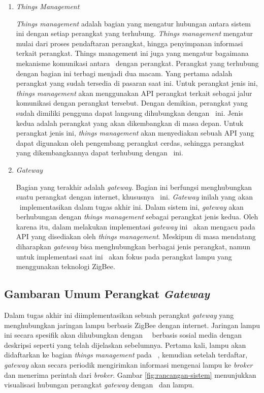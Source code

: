 \begin{enumerate}
	\item \textit{Things Management}
	
	\textit{Things management} adalah bagian yang mengatur hubungan antara sistem ini dengan setiap perangkat yang terhubung. \textit{Things management} mengatur mulai dari proses pendaftaran perangkat, hingga penyimpanan informasi terkait perangkat. Things management ini juga yang mengatur bagaimana mekanisme komunikasi antara \plat~dengan perangkat. Perangkat yang terhubung dengan bagian ini terbagi menjadi dua macam. Yang pertama adalah perangkat yang sudah tersedia di pasaran saat ini. Untuk perangkat jenis ini, \textit{things management} akan menggunakan API perangkat terkait sebagai jalur komunikasi dengan perangkat tersebut. Dengan demikian, perangkat yang sudah dimiliki pengguna dapat langsung dihubungkan dengan \plat~ini. Jenis kedua adalah perangkat yang akan dikembangkan di masa depan. Untuk perangkat jenis ini, \textit{things management} akan menyediakan sebuah API yang dapat digunakan oleh pengembang perangkat cerdas, sehingga perangkat yang dikembangkannya dapat terhubung dengan \plat~ini.
	
	\item \textit{Gateway}
	
	Bagian yang terakhir adalah \textit{gateway}. Bagian ini berfungsi menghubungkan suatu perangkat dengan internet, khususnya \plat~ini. \textit{Gateway} inilah yang akan \saya~implementasikan dalam tugas akhir ini. Dalam sistem ini, \textit{gateway} akan berhubungan dengan \textit{things management} sebagai perangkat jenis kedua. Oleh karena itu, dalam melakukan implementasi \textit{gateway} ini \saya~akan mengacu pada API yang disediakan oleh \textit{things management}. Meskipun di masa mendatang diharapkan \textit{gateway} bisa menghubungkan berbagai jenis perangkat, namun untuk implementasi saat ini \saya~akan fokus pada perangkat lampu yang menggunakan teknologi ZigBee.
	
\end{enumerate}

\subsection{Gambaran Umum Perangkat \textit{Gateway}}
Dalam tugas akhir ini diimplementasikan sebuah perangkat \textit{gateway} yang menghubungkan jaringan lampu berbasis ZigBee dengan internet. Jaringan lampu ini secara spesifik akan dihubungkan dengan \plat~\iot~berbasis sosial media dengan deskripsi seperti yang telah dijelaskan sebelumnya. Pertama kali, lampu akan didaftarkan ke bagian \textit{things management} pada \plat~, kemudian setelah terdaftar, \textit{gateway} akan secara periodik mengirimkan informasi mengenai lampu ke \textit{broker} dan menerima perintah dari \textit{broker}. Gambar \ref{fig:rancangan-sistem} menunjukkan visualisasi hubungan perangkat \textit{gateway} dengan \plat~dan lampu.


